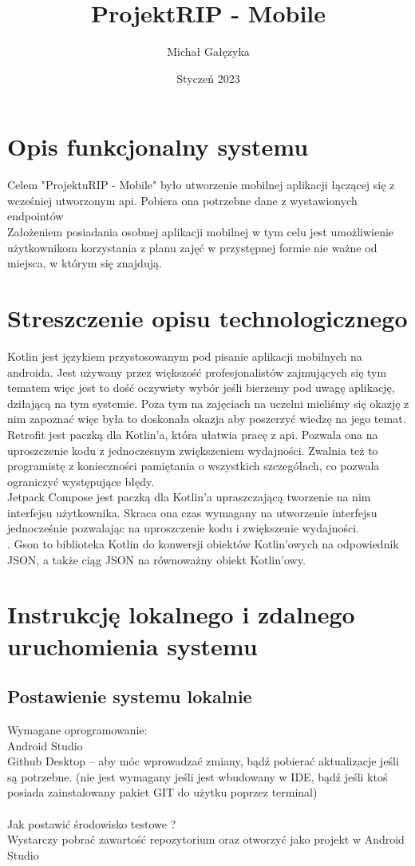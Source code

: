 \documentclass{article}
\title{Projekt\textunderscore RIP - Mobile}
\author{
Michał Gałęzyka
}
\date{Styczeń 2023}
\begin{document}
\maketitle

\section{Opis funkcjonalny systemu}
Celem "Projektu\textunderscore RIP - Mobile" było utworzenie mobilnej aplikacji łączącej się z wcześniej utworzonym api. Pobiera ona potrzebne dane z wystawionych endpointów 
\\
Założeniem posiadania osobnej aplikacji mobilnej w tym celu jest umożliwienie użytkownikom korzystania z planu zajęć w przystępnej formie nie ważne od miejsca, w którym się znajdują.

\section{Streszczenie opisu technologicznego}
Kotlin jest językiem przystosowanym pod pisanie aplikacji mobilnych na androida. Jest używany przez większość profesjonalistów zajmujących się tym tematem więc jest to dość oczywisty wybór jeśli bierzemy pod uwagę aplikację, dziłającą na tym systemie. Poza tym na zajęciach na uczelni mieliśmy się okazję z nim zapoznać więc była to doskonała okazja aby poszerzyć wiedzę na jego temat.
\\
Retrofit jest paczką dla Kotlin'a, która ułatwia pracę z api. Pozwala ona na uproszczenie kodu z jednoczesnym zwiększeniem wydajności. Zwalnia też to programistę z konieczności pamiętania o wszystkich szczegółach, co pozwala ograniczyć występujące błędy.
\\
Jetpack Compose jest paczką dla Kotlin'a upraszczającą tworzenie na nim interfejsu użytkownika. Skraca ona czas wymagany na utworzenie interfejsu jednocześnie pozwalając na uproszczenie kodu i zwiększenie wydajności.
\\.
Gson to biblioteka Kotlin do konwersji obiektów Kotlin'owych na odpowiednik JSON, a także ciąg JSON na równoważny obiekt Kotlin'owy.

\section{Instrukcję lokalnego i zdalnego uruchomienia systemu}
\subsection{Postawienie systemu lokalnie}
Wymagane oprogramowanie:\\
Android Studio\\
Github Desktop – aby móc wprowadzać zmiany, bądź pobierać aktualizacje jeśli są potrzebne. (nie jest wymagany  jeśli jest wbudowany w IDE, bądź jeśli ktoś posiada zainstalowany pakiet GIT do użytku poprzez terminal)\\\\
Jak postawić środowisko testowe ?\\
Wystarczy pobrać zawartość repozytorium oraz otworzyć jako projekt w Android Studio
\end{document}
